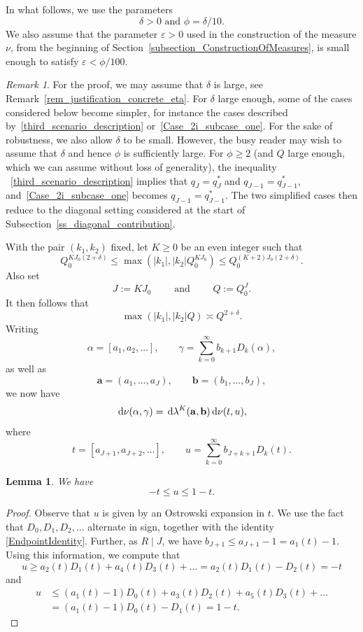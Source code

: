 \documentclass[12pt, reqno]{amsart}
\newtheorem{lemma}[thm]{Lemma}
\theoremstyle{definition}
\theoremstyle{remark}
\newtheorem{remark}[thm]{Remark}
\numberwithin{equation}{section}
\def\alp{{\alpha}} \def\bfalp{{\boldsymbol \alpha}}
\def\gam{{\gamma}} \def\Gam{{\Gamma}}
\def\del{{\delta}} \def\Del{{\Delta}}
\def\lam{{\lambda}} \def\Lam{{\Lambda}} \def\Lamtil{{\widetilde \Lambda}}
\def\le{\leqslant} \def\ge{\geqslant}
\def\leq{\leqslant}
\def\geq{\geqslant}
\def\d{{\,{\rm d}}}
\def \ba {\mathbf a}
\def \bb {\mathbf b}
\begin{document}
In what follows, we use the parameters
\begin{equation} \label{def_delta_phi}
\delta>0 \text{ and } \phi=\delta/10.
\end{equation}
We also assume that the parameter $\varepsilon>0$ used in the construction of the measure $\nu$, from the beginning of Section~\ref{subsection_ConstructionOfMeasures}, is small enough to satisfy $\varepsilon<\phi/100$.

\begin{remark}
For the proof, we may assume that $\delta$ is large, see Remark~\ref{rem_justification_concrete_eta}. For $\delta$ large enough, some of the cases considered below become simpler, for instance the cases described by~\eqref{third_scenario_description} or~\eqref{Case_2i_subcase_one}. For the sake of robustness, we also allow $\del$ to be small. However, the busy reader may wish to assume that $\del$ and hence $\phi$ is sufficiently large.
For $\phi\geq 2$ (and $Q$ large enough, which we can assume without loss of generality), the inequality ~\eqref{third_scenario_description} implies that
$q_J=q_J^*$ and 
$q_{J-1}=q_{J-1}^*$, and~\eqref{Case_2i_subcase_one} becomes $q_{J-1}=q_{J-1}^*$. The two simplified cases then reduce to the diagonal setting considered at the start of Subsection~\ref{ss_diagonal_contribution}.
\end{remark}

With the pair $(k_1, k_2)$ fixed, let $K \ge 0$ be an even integer such that
\[
Q_0^{KJ_0(2+\delta)}
\leq\max
\left(|k_1|, |k_2| 
Q_0^{KJ_0}\right)\leq Q_0^{(K+2)J_0(2+\delta)}.
\]
Also set
\[
J := KJ_0 \qquad \text{ and } \qquad
Q := Q_0^{J}.
\]
It then follows that
\begin{equation} \label{kk_size}
\max\left(|k_1|,|k_2| Q\right)\asymp Q^{2+\delta}.
\end{equation}
Writing
\[
\alp = [a_1,a_2,\ldots],
\qquad 
\gam = \sum_{k=0}^\infty b_{k+1} D_k(\alp),
\]
as well as
\[
\ba = (a_1,\ldots,a_J), \qquad
\bb = (b_1,\ldots,b_J),
\]
we now have
\begin{equation} \label{factor}
\d \nu(\alp,\gam) = \d \lam^K(\ba,\bb) \d \nu(t,u),
\end{equation}
where
\[
t = [a_{J+1},a_{J+2},\ldots],
\qquad
u = \sum_{k=0}^\infty b_{J+k+1} D_k(t).
\]

\begin{lemma} We have
\[
-t \le u \le 1-t.
\]
\end{lemma}

\begin{proof} Observe that $u$ is given by an Ostrowski expansion in $t$. We use the fact that $D_0, D_1, D_2, \ldots$ alternate in sign, together with the identity \eqref{EndpointIdentity}. Further, as $R \mid J$, we have $b_{J+1} \le a_{J+1} - 1 = a_1(t) - 1$. Using this information, we compute that
\[
u \ge a_2(t) D_1(t) + a_4(t) D_3(t) + \dots
= a_2(t) D_1(t) - D_2(t) = - t
\]
and
\begin{align*}
u &\le (a_1(t) - 1) D_0(t) + a_3(t) D_2(t) + a_5(t) D_3(t) + \dots
\\ &= (a_1(t) - 1) D_0(t) - D_1(t) = 1 - t.
\end{align*}
\end{proof}
\end{document}
